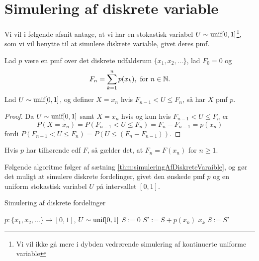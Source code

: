 \section{Simulering af diskrete variable}
Vi vil i følgende afsnit antage, at vi har en stokastisk variabel $U \sim \textnormal{unif}[0,1]$\footnote{Vi vil ikke gå mere i dybden vedrørende simulering af kontinuerte uniforme variable}, som vi vil benytte til at simulere diskrete variable, givet deres pmf.
\begin{thm} \label{thm:simuleringAfDiskreteVaraible}
    Lad $p$ være en pmf over det diskrete udfaldsrum $\{x_1, x_2, \ldots\}$, lad $F_0 = 0$ og
    \begin{equation*}
        F_n = \sum^n_{k = 1} p(x_k), \text{ for } n \in \mathbb{N}.
    \end{equation*}
    Lad $U \sim \textnormal{unif}[0, 1]$, og definer $X = x_n$ hvis $F_{n - 1} < U \leq F_n$, så har $X$ pmf $p$.
\end{thm}

\begin{proof}
    Da $U \sim \textnormal{unif}[0, 1]$ samt $X = x_n$ hvis og kun hvis $F_{n - 1} < U \leq F_n$ er
    \begin{equation*}
        P(X = x_n) = P(F_{n - 1} < U \leq F_n) = F_n - F_{n - 1} = p(x_n)
    \end{equation*}
    fordi $P(F_{n - 1} < U \leq F_n) = P\left(U \leq (F_n - F_{n - 1})\right)$.
\end{proof}

\begin{rem}
Hvis $p$ har tilhørende cdf $F$, så gælder det, at $F_n = F(x_n)$ for $n \geq 1$.
\end{rem}
Følgende algoritme følger af sætning \ref{thm:simuleringAfDiskreteVaraible}, og gør det muligt at simulere diskrete fordelinger, givet den ønskede pmf $p$ og en uniform stokastisk variabel $U$ på intervallet $[0, 1]$.

\begin{algorithm} 
\caption{Simulering af diskrete fordelinger}\label{alg:discreteSimulation} 
\begin{algorithmic}[1] 
 {$p: \{x_1, x_2, \ldots\} \rightarrow [0, 1]$, $U \sim \textnormal{unif}[0, 1]$}
    \State $S := 0$
        \State $S' := S + p(x_k)$ 
         \Return $x_k$
        \EndIf
        \State $S := S'$
    \EndFor
\EndProcedure
\end{algorithmic}
\end{algorithm} 



